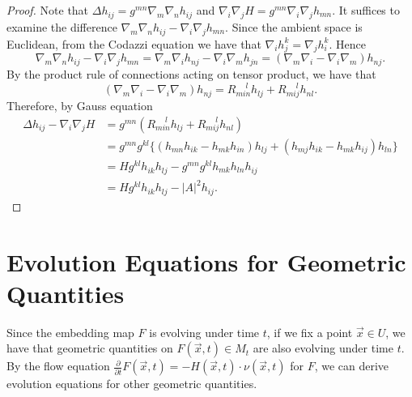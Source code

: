 \begin{proof}
	Note that $\Delta h_{ij}^{} = g_{}^{mn} \nabla_{m}\nabla_{n} h_{ij}^{} $ and $\nabla_{i}\nabla_{j} H = g_{}^{mn } \nabla_{i}\nabla_{j} h_{mn }^{} $. It suffices to examine the difference $\nabla_{m}\nabla_{n} h_{ij}^{} - \nabla_{i}\nabla_{j} h_{mn}^{} .$ Since the ambient space is Euclidean, from the Codazzi equation we have that $\nabla_{i}^{} h_{j}^{k} = \nabla_{j}^{} h_{i}^{k}$. Hence \[\nabla_{m}\nabla_{n} h_{ij}^{} - \nabla_{i}\nabla_{j} h_{mn}^{} = \nabla_{m}\nabla_{i} h_{nj}^{} - \nabla_{i}\nabla_{m} h_{jn}^{}=(\nabla_{m}\nabla_{i}  - \nabla_{i}\nabla_{m})h_{nj}^{}.\] By the product rule of connections acting on tensor product, we have that \[(\nabla_{m}\nabla_{i}  - \nabla_{i}\nabla_{m})h_{nj}^{} = R_{min}^{\quad\  l} h_{lj}^{} + R_{mij}^{\quad \ l} h_{nl }^{}.  \]
	Therefore, by Gauss equation
	\begin{equation*}
		\begin{split}
			\Delta h_{ij}^{} - \nabla_{i}\nabla_{j} H
			&= g_{}^{mn} (R_{min }^{\quad \ l} h_{lj}^{} + R_{mij}^{\quad \ l} h_{nl }^{} ) \\
			&= g_{}^{mn } g_{}^{kl} \{(h_{mn}^{} h_{ik }^{} -h_{mk }^{} h_{in }^{} )h_{lj}^{} + (h_{mj }^{} h_{ik }^{} - h_{mk }^{} h_{ij}^{} )h_{ln}^{} \}\\
			&= H g_{}^{kl} h_{ik }^{}  h_{lj}^{} - g_{}^{mn } g_{}^{kl } h_{mk }^{} h_{ln }^{} h_{ij}^{} \\
			&= H g_{}^{kl} h_{ik }^{}  h_{lj}^{} - \left| A \right| ^2 h_{ij}^{} .
		\end{split}
	\end{equation*}
\end{proof}


\section{Evolution Equations for Geometric Quantities}


Since the embedding map $F$ is evolving under time $t$, if we fix a point $\vec{x} \in U$, we have that geometric quantities on $F(\vec{x},t) \in M_t$ are also evolving under time $t$. By the flow equation $\frac{\partial }{\partial t} F(\vec{x},t)=-H(\vec{x},t) \cdot \nu (\vec{x},t)$ for $F$, we can derive evolution equations for other geometric quantities.

